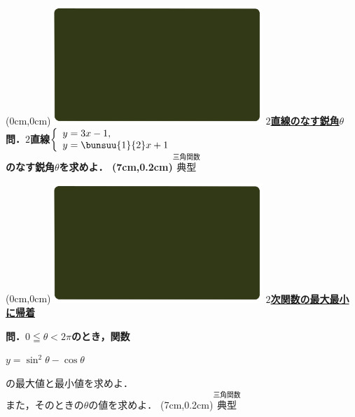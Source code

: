 \documentclass[10pt,
fleqn,
dvipdfmx,
uplatex
]{jsarticle}
\begin{document}
\at(0cm,0cm){\includegraphics[width=8cm,bb=0 0 1920 1080]{./youtube/thumbnails/templates/smart_background/三角関数.jpeg}}
{\color{orange}\bf\boldmath\LARGE\underline{$2$直線のなす鋭角$\theta$}}\vspace{0.3zw}\\
\LARGE 
\bf\boldmath 問．$2$直線$\left\{\begin{array}{l}y=3x-1,\;\\y=\bunsuu{1}{2}x+1\end{array}\right.$\vspace{0.3zw}\\
\hfill のなす鋭角$\theta$を求めよ．
\at(7cm,0.2cm){\small\color{bradorange}$\overset{\text{三角関数}}{\text{典型}}$}

\newpage

\at(0cm,0cm){\includegraphics[width=8cm,bb=0 0 1920 1080]{./youtube/thumbnails/templates/smart_background/三角関数.jpeg}}
{\color{orange}\bf\boldmath\Large\underline{$2$次関数の最大最小に帰着}}\vspace{0.3zw}

\large 
\bf\boldmath 問．$0\leqq \theta <2\pi$のとき，関数

\Huge
\hspace{0.1zw}
$y=\sin ^2\theta -\cos \theta$

\large 
\vspace{0.8zw}
の最大値と最小値を求めよ．\\
\hfill また，そのときの$\theta$の値を求めよ．
\at(7cm,0.2cm){\small\color{bradorange}$\overset{\text{三角関数}}{\text{典型}}$}

\newpage
\end{document}
